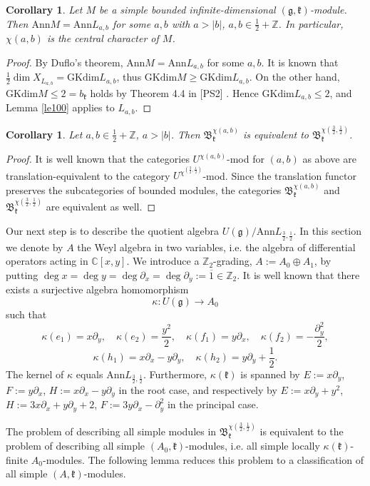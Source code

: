 \documentclass[12pt]{amsart}
\theoremstyle{plain} %
\newtheorem{corollary}[definition]{Corollary}
\newcommand{\ann}{\mathrm{Ann}}
\newcommand {\ZZ} {\mathbb {Z}}
\newcommand {\CC} {\mathbb {C}}
\newcommand{\kk}{\mathfrak{k}}
\renewcommand{\gg}{\mathfrak{g}}
\newcommand {\BB} {\mathfrak {B}}
\newcommand{\del}{\partial}
\newcommand{\half}{\frac{1}{2}}
\newcommand{\threehalfs}{\frac{3}{2}}
\newcommand {\eqdef} {:=}
\newcommand{\refle}[1]{Lemma \ref{#1}}
\newcommand {\univ} {U}
\newcommand {\gkdim} {\mathrm{GKdim }}
\newcommand {\gkm} {$(\gg,\kk)$-module}
\begin{document}
\begin {corollary}\label{cor101}
Let $M$ be a simple bounded infinite-dimensional \gkm. Then $\ann M= \ann L_{a,b}$ for some $a,b$ with $a>|b|$, $a,b\in\half+\ZZ$. In particular, $\chi(a,b)$ is the central character of $M$.
\end{corollary}
\begin {proof}
By Duflo's theorem, $\ann M = \ann L_{a,b}$ for some $a,b$. It is known that $\half\dim X_{L_{a,b}}=\gkdim L_{a,b}$, thus $\gkdim M\geq \gkdim L_{a,b}$. On the other hand, \mbox{$\displaystyle\gkdim M\leq 2=b_\kk$} holds by Theorem 4.4 in [PS2] . Hence $\gkdim L_{a,b}\leq 2$, and \refle{le100} applies to $L_{a,b}$.
\end{proof}

\begin {corollary}\label{cor102}
Let $a,b\in \half+\ZZ$, $a>|b|$. Then $\BB_\kk^{\chi(a,b)}$ is equivalent to $\BB_\kk^{\chi(\threehalfs,\half)}$.
\end {corollary}
\begin{proof}
It is well known that the categories $U^{\chi(a,b)}$-mod for $(a,b)$ as above are translation-equivalent to the category $U^{\chi^(\frac{3}{2},\frac{1}{2})}$-mod. Since the translation functor preserves the subcategories of bounded modules, the categories $\BB_\kk^{\chi(a,b)}$ and $\BB_\kk^{\chi(\threehalfs,\half)}$ are equivalent as well. 
\end{proof}

Our next step is to describe the quotient algebra $\univ(\gg) / \ann L_{\threehalfs,\half}$. In this section we denote by $A$ the Weyl algebra in two variables, i.e. the algebra of differential operators acting in $\CC[x,y]$. We introduce a $\ZZ_2$-grading, $A\eqdef A_0\oplus A_1$, by putting $\deg x=\deg y=\deg\del_x=\deg\del_y\eqdef \overline{1}\in\ZZ_2$. It is well known that there exists a surjective algebra homomorphism
\[
\kappa:\univ(\gg)\to A_0
\]
such that
\[
\kappa(e_1)=x\del_y,\quad \kappa (e_2)=\frac{y^2}{2},\quad \kappa (f_1)=y\del_x, \quad \kappa (f_2)=-\frac{\del_y^2}{2},
\]
\[
\kappa(h_1)=x\del_x-y\del_y,\quad \kappa(h_2)=y\del_y+\half.
\]
The kernel of $\kappa$ equals $\ann L_{\threehalfs,\half}$. Furthermore, $\kappa (\kk)$ is spanned by $E\eqdef x\del_y$, $F\eqdef y\del_x$, $H\eqdef x\del_x-y\del_y$ in the root case, and respectively by $E\eqdef x\del_y+y^2$, $H\eqdef 3x\del_x+y\del_y+2$, $F\eqdef 3y\del_x-\del_y^2$ in the principal case.

The problem of describing all simple modules in $\BB_\kk^{\chi(\threehalfs,\half)}$ is equivalent to the problem of describing all simple $(A_0,\kk)$-modules, i.e. all simple locally $\kappa(\kk)$-finite $A_0$-modules. The following lemma reduces this problem to a classification of all simple $(A,\kk)$-modules.
\end{document}
